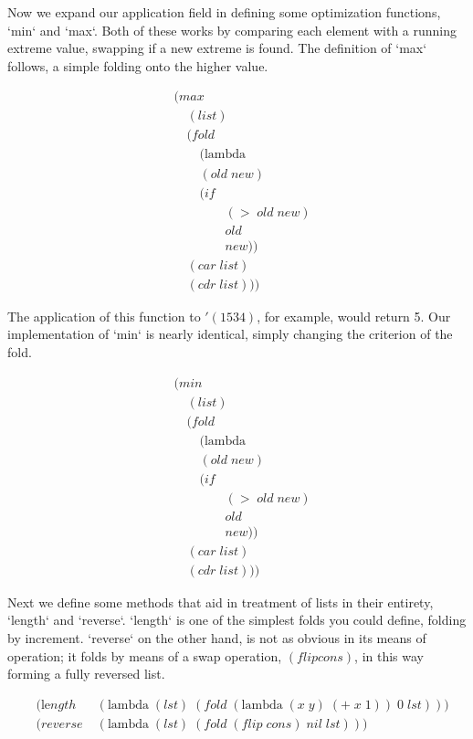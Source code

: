 Now we expand our application field in defining some optimization functions, `min` 
and `max`. Both of these works by comparing each element with a running extreme 
value, swapping if a new extreme is found. The definition of `max` follows, a 
simple folding onto the higher value.

\begin{align*}
& (max \; 
\\& \quad (list)
\\& \quad (fold \; 
\\& \qquad (\text{lambda} \; 
\\& \qquad (old \; new)
\\& \qquad (if
\\& \qquad \qquad (> \; old \; new)
\\& \qquad \qquad old
\\& \qquad \qquad new))
\\& \quad (car \; list)
\\& \quad (cdr \; list)))
\end{align*}

The application of this function to $'(1 5 3 4)$, for example, would return 5. Our 
implementation of `min` is nearly identical, simply changing the criterion of the 
fold.

\begin{align*}
& (min \; 
\\& \quad (list)
\\& \quad (fold \; 
\\& \qquad (\text{lambda} \; 
\\& \qquad (old \; new)
\\& \qquad (if
\\& \qquad \qquad (> \; old \; new)
\\& \qquad \qquad old
\\& \qquad \qquad new))
\\& \quad (car \; list)
\\& \quad (cdr \; list)))
\end{align*}

Next we define some methods that aid in treatment of lists in their entirety, 
`length` and `reverse`. `length` is one of the simplest folds you could define, 
folding by increment. `reverse` on the other hand, is not as obvious in its means 
of operation; it folds by means of a swap operation, $(flip cons)$, in this way 
forming a fully reversed list.

\begin{align*}
& (\text{le}ngth \; &(\text{lambda} \; (lst) \; (fold \; (\text{lambda} \; (x \; y) \; (+ \; x \; 1)) \; 0 \; lst)))
\\& (reverse \; &(\text{lambda} \; (lst) \; (fold \; (flip \; cons) \; nil \; lst)))
\end{align*}

